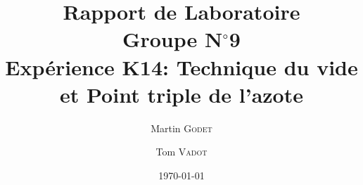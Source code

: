 \documentclass[a4paper, 12pt, oneside]{article}
\begin{document}
\title{Rapport de Laboratoire\\Groupe N$^\circ$9\\Expérience K14: Technique du vide et Point triple de l’azote}
\author{Martin \textsc{Godet} \and Tom \textsc{Vadot}}
\date{\today}

\maketitle









\nocite{*}  %
\printbibliography

\newpage

\begin{appendices}

\end{appendices}
\end{document}
